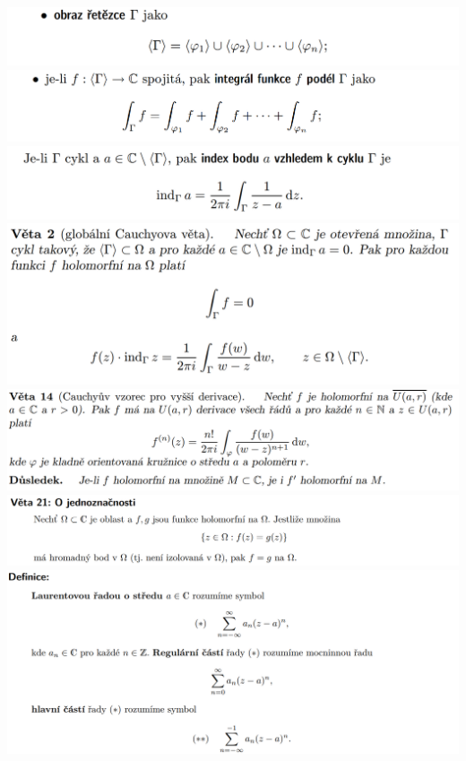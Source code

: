 \documentclass[12pt,a4paper]{article}
\begin{document}
\begin{center}
		\includegraphics[width=\textwidth]{img/5komp/2020-06-21 10 08 48.png}\vspace{0.3cm}
		\includegraphics[width=\textwidth]{img/5komp/2020-06-21 10 08 56.png}\vspace{0.3cm}
		\includegraphics[width=\textwidth]{img/5komp/2020-06-21 10 09 13.png}\vspace{0.3cm}
		\includegraphics[width=\textwidth]{img/5komp/2020-06-21 10 09 31.png}\vspace{0.3cm}
		\includegraphics[width=\textwidth]{img/5komp/2020-06-21 10 34 53.png}\vspace{0.3cm}
		\includegraphics[width=\textwidth]{img/5komp/2020-06-21 10 01 16.png}\vspace{0.3cm}
		\includegraphics[width=\textwidth]{img/5komp/2020-06-21 10 02 36.png}\vspace{0.3cm}

\end{center}
\end{document}
